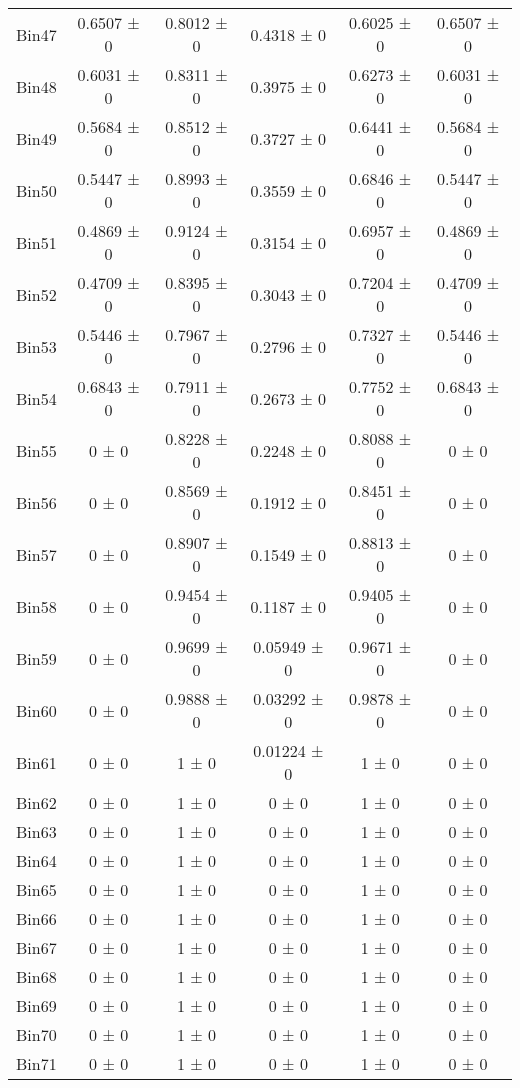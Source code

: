 \begin{tabular}{@{\extracolsep{4pt}}lccccc@{}}
     Bin47 & 0.6507 ± 0 & 0.8012 ± 0 & 0.4318 ± 0 & 0.6025 ± 0 & 0.6507 ± 0 \\ 
     Bin48 & 0.6031 ± 0 & 0.8311 ± 0 & 0.3975 ± 0 & 0.6273 ± 0 & 0.6031 ± 0 \\ 
     Bin49 & 0.5684 ± 0 & 0.8512 ± 0 & 0.3727 ± 0 & 0.6441 ± 0 & 0.5684 ± 0 \\ 
     Bin50 & 0.5447 ± 0 & 0.8993 ± 0 & 0.3559 ± 0 & 0.6846 ± 0 & 0.5447 ± 0 \\ 
     Bin51 & 0.4869 ± 0 & 0.9124 ± 0 & 0.3154 ± 0 & 0.6957 ± 0 & 0.4869 ± 0 \\ 
     Bin52 & 0.4709 ± 0 & 0.8395 ± 0 & 0.3043 ± 0 & 0.7204 ± 0 & 0.4709 ± 0 \\ 
     Bin53 & 0.5446 ± 0 & 0.7967 ± 0 & 0.2796 ± 0 & 0.7327 ± 0 & 0.5446 ± 0 \\ 
     Bin54 & 0.6843 ± 0 & 0.7911 ± 0 & 0.2673 ± 0 & 0.7752 ± 0 & 0.6843 ± 0 \\ 
     Bin55 & 0 ± 0 & 0.8228 ± 0 & 0.2248 ± 0 & 0.8088 ± 0 & 0 ± 0 \\ 
     Bin56 & 0 ± 0 & 0.8569 ± 0 & 0.1912 ± 0 & 0.8451 ± 0 & 0 ± 0 \\ 
     Bin57 & 0 ± 0 & 0.8907 ± 0 & 0.1549 ± 0 & 0.8813 ± 0 & 0 ± 0 \\ 
     Bin58 & 0 ± 0 & 0.9454 ± 0 & 0.1187 ± 0 & 0.9405 ± 0 & 0 ± 0 \\ 
     Bin59 & 0 ± 0 & 0.9699 ± 0 & 0.05949 ± 0 & 0.9671 ± 0 & 0 ± 0 \\ 
     Bin60 & 0 ± 0 & 0.9888 ± 0 & 0.03292 ± 0 & 0.9878 ± 0 & 0 ± 0 \\ 
     Bin61 & 0 ± 0 & 1 ± 0 & 0.01224 ± 0 & 1 ± 0 & 0 ± 0 \\ 
     Bin62 & 0 ± 0 & 1 ± 0 & 0 ± 0 & 1 ± 0 & 0 ± 0 \\ 
     Bin63 & 0 ± 0 & 1 ± 0 & 0 ± 0 & 1 ± 0 & 0 ± 0 \\ 
     Bin64 & 0 ± 0 & 1 ± 0 & 0 ± 0 & 1 ± 0 & 0 ± 0 \\ 
     Bin65 & 0 ± 0 & 1 ± 0 & 0 ± 0 & 1 ± 0 & 0 ± 0 \\ 
     Bin66 & 0 ± 0 & 1 ± 0 & 0 ± 0 & 1 ± 0 & 0 ± 0 \\ 
     Bin67 & 0 ± 0 & 1 ± 0 & 0 ± 0 & 1 ± 0 & 0 ± 0 \\ 
     Bin68 & 0 ± 0 & 1 ± 0 & 0 ± 0 & 1 ± 0 & 0 ± 0 \\ 
     Bin69 & 0 ± 0 & 1 ± 0 & 0 ± 0 & 1 ± 0 & 0 ± 0 \\ 
     Bin70 & 0 ± 0 & 1 ± 0 & 0 ± 0 & 1 ± 0 & 0 ± 0 \\ 
     Bin71 & 0 ± 0 & 1 ± 0 & 0 ± 0 & 1 ± 0 & 0 ± 0 \\ 

\end{tabular}
